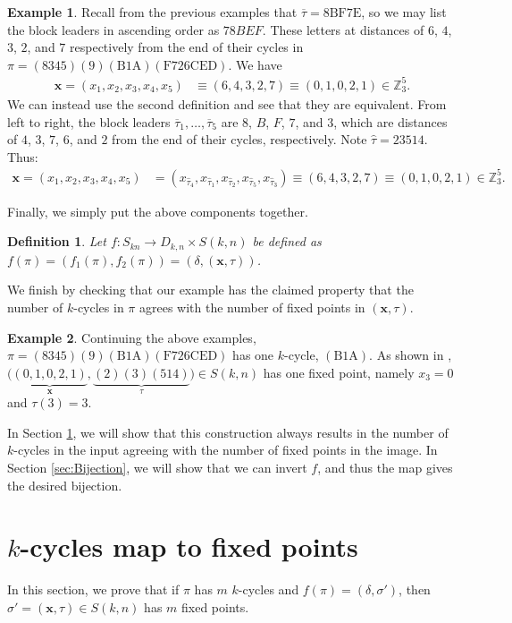\documentclass{article}
\numberwithin{theorem}{section}
\newtheorem{definition}[theorem]{Definition}
\theoremstyle{definition}
\newtheorem{example}{Example}
\newcommand\taubar{\overline\tau}
\newcommand{\x}{\mathbf x}
\newcommand{\xtau}{(\x,\tau)}
\newcommand{\deltaxtau}{\left(\delta,\xtau\right)}
\begin{document}
\begin{example}
    Recall from the previous examples that $\taubar = \mathrm{8BF7E}$, so we may list the block leaders in ascending order as $78BEF$. These letters at distances of $6$, $4$, $3$, $2$, and $7$ respectively from the end of their cycles in $\pi = \mathrm{(8345)(9)(B1A)(F726CED)}$. We have \begin{align*}
        \x = (x_1, x_2, x_3, x_4, x_5) &\equiv (6,4,3,2,7) \equiv (0,1,0,2,1) \in \mathbb{Z}^5_3.
    \end{align*}
    We can instead use the second definition and see that they are equivalent. From left to right, the block leaders $\overline{\tau}_1,\dots,\overline{\tau}_5$ are $8$, $B$, $F$, $7$, and $3$, which are distances of $4$, $3$, $7$, $6$, and $2$ from the end of their cycles, respectively. Note $\hat\tau = 23514$. Thus:
    \begin{align*}
        \x = (x_1, x_2, x_3, x_4, x_5) &= (x_{\hat\tau_4}, x_{\hat\tau_1}, x_{\hat\tau_2}, x_{\hat\tau_5}, x_{\hat\tau_3})\equiv (6,4,3,2,7) \equiv (0,1,0,2,1) \in \mathbb{Z}^5_3.
    \end{align*}
\end{example}
Finally, we simply put the above components together.
\begin{definition}
    Let $f\colon S_{kn} \to D_{k,n} \times S(k,n)$ be defined as
    \(f(\pi) = \left(f_1(\pi),f_2(\pi)\right) = \deltaxtau\).
\end{definition}
We finish by checking that our example has the claimed property that the number of $k$-cycles in $\pi$ agrees with the number of fixed points in $\xtau$.
\begin{example}
     Continuing the above examples, $\pi = \mathrm{(8345)(9)(B1A)(F726CED)}$ has one $k$-cycle, $\mathrm{(B1A)}$. As shown in , $\big(\underbrace{(0,1,0,2,1)}_\mathbf{x},\underbrace{(2)(3)(514)}_\tau\big)\in S(k,n)$ has one fixed point, namely $x_3=0$ and $\tau(3) = 3$.
\end{example}
In Section \ref{sec:StatisticsPreserved}, we will show that this construction always results in the number of $k$-cycles in the input agreeing with the number of fixed points in the image. In Section \ref{sec:Bijection}, we will show that we can invert $f$, and thus the map gives the desired bijection.

\section{\texorpdfstring{$k$}{k}-cycles map to fixed points}
\label{sec:StatisticsPreserved}
In this section, we prove that if $\pi$ has $m$ $k$-cycles and $f(\pi) = \left(\delta, \sigma'\right)$, then $\sigma' = \xtau \in S(k,n)$ has $m$ fixed points.
\end{document}

